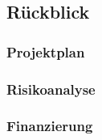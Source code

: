 \subsection{Rückblick}

\subsubsection{Projektplan}
\label{projektplan}

\subsubsection{Risikoanalyse}

\subsubsection{Finanzierung}
\label{finanzierung}
